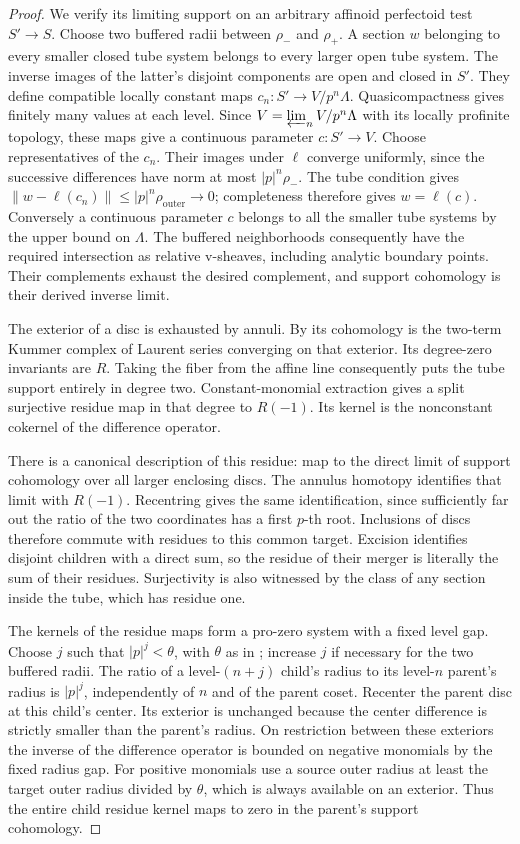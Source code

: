 \begin{proof}
We verify its limiting support on an arbitrary affinoid
perfectoid test $S'\to S$.  Choose two buffered radii between
$\rho_-$ and $\rho_+$.  A section $w$ belonging to every
smaller closed tube system belongs to every larger open
tube system.  The inverse images of the latter's disjoint
components are open and closed in $S'$.  They define
compatible locally constant maps
$c_n:S'\to V/p^n\Lambda$.  Quasicompactness gives finitely
many values at each level.  Since
$V=\varprojlim_n V/p^n\Lambda$ with its locally profinite
topology, these maps give a continuous parameter $c:S'\to V$.
Choose representatives of the $c_n$.  Their images under
$\ell$ converge uniformly, since the successive differences
have norm at most $|p|^n\rho_-$.  The tube condition gives
$\|w-\ell(c_n)\|\leq |p|^n\rho_{\mathrm{outer}}\to0$;
completeness therefore gives $w=\ell(c)$.  Conversely a
continuous parameter $c$ belongs to all the smaller tube
systems by the upper bound on $\Lambda$.  The buffered
neighborhoods consequently have the required intersection
as relative v-sheaves, including analytic boundary points.
Their complements exhaust the desired complement, and
support cohomology is their derived inverse limit.

The exterior of a disc is exhausted by annuli.  By
 its cohomology is the two-term
Kummer complex of Laurent series converging on that exterior.
Its degree-zero invariants are $R$.  Taking the fiber from
the affine line consequently puts the tube support entirely
in degree two.  Constant-monomial extraction gives a split
surjective residue map in that degree to $R(-1)$.
Its kernel is the nonconstant cokernel of the difference
operator.

There is a canonical description of this residue: map to
the direct limit of support cohomology over all larger
enclosing discs.  The annulus homotopy identifies that
limit with $R(-1)$.  Recentring gives the same identification,
since sufficiently far out the ratio of the two coordinates
has a first $p$-th root.  Inclusions of discs therefore
commute with residues to this common target.  Excision
identifies disjoint children with a direct sum, so the
residue of their merger is literally the sum of their
residues.  Surjectivity is also witnessed by the class of
any section inside the tube, which has residue one.

The kernels of the residue maps form a pro-zero system with
a fixed level gap.  Choose $j$ such that $|p|^j<\theta$, with
$\theta$ as in ; increase $j$
if necessary for the two buffered radii.  The ratio of a
level-$(n+j)$ child's radius to its level-$n$ parent's radius
is $|p|^j$, independently of $n$ and of the parent coset.
Recenter the parent disc at this child's center.  Its exterior
is unchanged because the center difference is strictly smaller
than the parent's radius.  On restriction between these
exteriors the inverse of the difference operator is bounded
on negative monomials by the fixed radius gap.  For positive
monomials use a source outer radius at least the target outer
radius divided by $\theta$, which is always available on an
exterior.  Thus the entire child residue kernel maps to zero
in the parent's support cohomology.


\end{proof}
